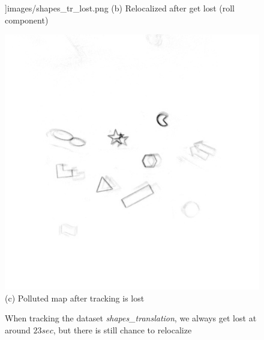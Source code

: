 \begin{enumerate}
\begin{figure}[h]
\begin{minipage}[t]{0.48\textwidth}
      \textwidth]{images/shapes_tr_lost.png} (b) Relocalized after get
      lost (roll component)
    \end{minipage}

   \begin{minipage}[t]{0.48\textwidth}
     \centering \includegraphics[width =
     \textwidth]{images/map_956.jpg} (c) Polluted map after tracking
     is lost
   \end{minipage} \caption{When tracking the dataset
     \textit{shapes\_translation}, we always get lost at around
     $23 sec$, but there is still chance to relocalize}
   \label{fig:shapes_tr_lost}
 \end{figure}

\end{enumerate}


